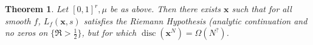 \documentclass{article}
\DeclareMathOperator{\disc}{disc}
\newcommand{\bx}{{\boldsymbol x}}
\newtheorem{theorem}[subsection]{Theorem}
\theoremstyle{definition}
\begin{document}
\begin{theorem}
Let $[0,1]^r,\mu$ be as above. Then there exists $\bx$ such that for all smooth 
$f$, $L_f(\bx,s)$ satisfies the Riemann Hypothesis (analytic continuation and 
no zeros on $\{\Re>\frac 1 2\}$, but for which 
$\disc(\bx^N)=\Omega(N^?)$. 
\end{theorem}








\end{document}
